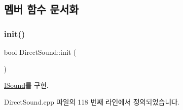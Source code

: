 \subsection{멤버 함수 문서화}
\mbox{\label{class_direct_sound_a006583b3b3c1b16ca4c54bf9a6141fb9}} 
\subsubsection{\texorpdfstring{init()}{init()}}
{\footnotesize\ttfamily bool Direct\+Sound\+::init (\begin{DoxyParamCaption}{ }\end{DoxyParamCaption})\hspace{0.3cm}{\ttfamily [virtual]}}



\mbox{\hyperlink{class_i_sound_ac14f05f2d5050cfefa4133099d9f656e}{I\+Sound}}를 구현.



Direct\+Sound.\+cpp 파일의 118 번째 라인에서 정의되었습니다.


